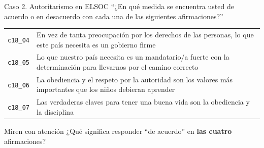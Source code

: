 \documentclass[aspectratio=169,11pt]{beamer}
\newcommand{\code}[1]{\texttt{\small #1}}                    %
\begin{document}
\begin{frame}{Caso 2. Autoritarismo en ELSOC}
\small
``¿En qué medida se encuentra usted de acuerdo o en desacuerdo con cada una de las siguientes afirmaciones?''
\medskip

\begin{center}
\begin{tabular}{lp{}}
\toprule
\rowcolor{crema}
\code{c18\_04} & En vez de tanta preocupación por los derechos de las personas, lo que este país necesita es un gobierno firme \\
\code{c18\_05} & Lo que nuestro país necesita es un mandatario/a fuerte con la determinación para llevarnos por el camino correcto \\
\rowcolor{crema}
\code{c18\_06} & La obediencia y el respeto por la autoridad son los valores más importantes que los niños debieran aprender \\
\code{c18\_07} & Las verdaderas claves para tener una buena vida son la obediencia y la disciplina \\
\bottomrule
\end{tabular}
\end{center}
\medskip
\begin{block}{Miren con atención}
\small
¿Qué significa responder ``de acuerdo'' en \textbf{las cuatro} afirmaciones?
\end{block}
\end{frame}
\end{document}
